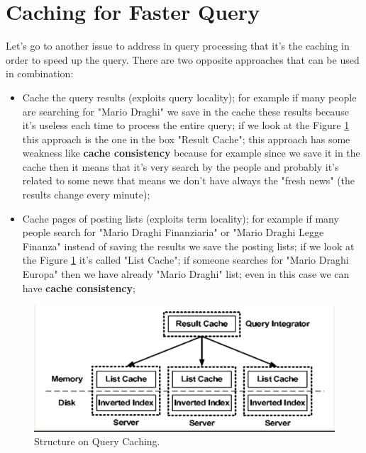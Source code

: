 \section{Caching for Faster Query}
Let's go to another issue to address in query processing that it's the caching in order to speed up the query.\newline
There are two opposite approaches that can be used in combination:
\begin{itemize}
    \item Cache the query results (exploits query locality); for example if many people are searching for "Mario Draghi" we save in the cache these results because it's useless each time to process the entire query; if we look at the Figure \ref{fig:queryresults} this approach is the one in the box "Result Cache"; this approach has some weakness like \textbf{cache consistency} because for example since we save it in the cache then it means that it's very search by the people and probably it's related to some news that means we don't have always the "fresh news" (the results change every minute);
    \item Cache pages of posting lists (exploits term locality); for example if many people search for "Mario Draghi Finanziaria" or "Mario Draghi Legge Finanza" instead of saving the results we save the posting lists; if we look at the Figure \ref{fig:queryresults} it's called "List Cache"; if someone searches for "Mario Draghi Europa" then we have already "Mario Draghi" list; even in this case we can have \textbf{cache consistency};
\end{itemize}
\begin{figure}
    \centering
    \includegraphics[width=0.75\linewidth]{images/queryresults.png}
    \caption{Structure on Query Caching.}
    \label{fig:queryresults}
\end{figure}

